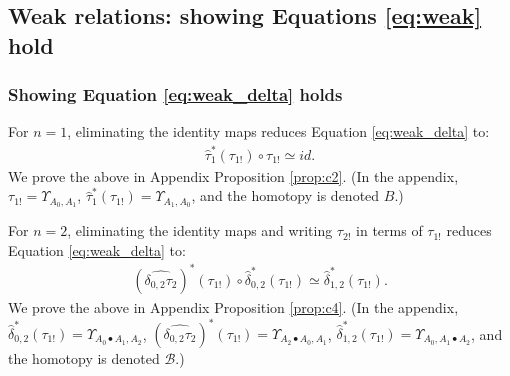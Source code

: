 \subsection{Weak relations: showing Equations \ref{eq:weak} hold} \label{sec:weak_relations}
\subsubsection{Showing Equation \ref{eq:weak_delta} holds}\label{sec:weak_relations_delta}
For $n=1$, eliminating the identity 
maps reduces Equation \ref{eq:weak_delta} to:
\begin{align*} 
\hat{\tau}_1^*(\tau_{1!}) \circ \tau_{1!} 
\simeq id.
\end{align*}
We prove the above in Appendix Proposition 
\ref{prop:c2}. (In the appendix, 
$\tau_{1!} = \Upsilon_{A_0,A_1}$, 
$\hat{\tau}_1^*(\tau_{1!}) = \Upsilon_{A_1,A_0}$, 
and the homotopy is denoted $B$.)

For $n=2$, eliminating the identity 
maps and writing $\tau_{2!}$ in terms 
of $\tau_{1!}$ reduces Equation \ref{eq:weak_delta} to:
\begin{align*} 
(\widehat{\delta_{0,2}\tau_2})^*(\tau_{1!}) \circ 
  \hat{\delta}_{0,2}^*(\tau_{1!})
\simeq \hat{\delta}_{1,2}^*(\tau_{1!}).
\end{align*}
We prove the above in Appendix Proposition 
\ref{prop:c4}. (In the appendix, 
$\hat{\delta}_{0,2}^*(\tau_{1!}) = 
\Upsilon_{A_0\bullet A_1, A_2}$, 
$(\widehat{\delta_{0,2}\tau_2})^*(\tau_{1!}) 
= \Upsilon_{A_2\bullet A_0,A_1}$, 
$\hat{\delta}_{1,2}^*(\tau_{1!}) =
\Upsilon_{A_0, A_1\bullet A_2}$, 
and the homotopy is denoted 
$\mathcal{B}$.)

